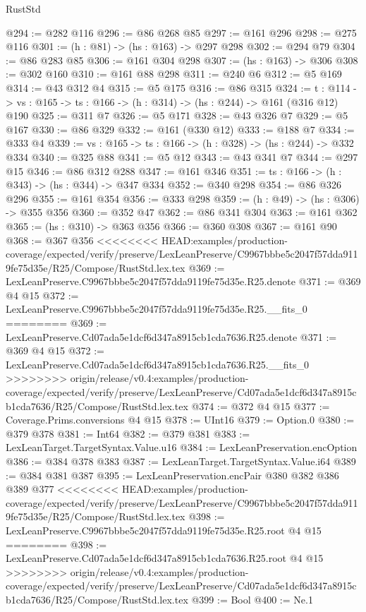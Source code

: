 \begin{lexlean}{RustStd}
\begin{coremodule}
{\begin{coremodule}
@294 := @282 @116
@296 := @86 @268 @85
@297 := @161 @296
@298 := @275 @116
@301 := (h : @81) -> (hs : @163) -> @297 @298
@302 := @294 @79
@304 := @86 @283 @85
@306 := @161 @304 @298
@307 := (hs : @163) -> @306
@308 := @302 @160
@310 := @161 @88 @298
@311 := @240 @6
@312 := @5 @169
@314 := @43 @312 @4
@315 := @5 @175
@316 := @86 @315
@324 := {t : @114} ->
  {vs : @165} -> {ts : @166} -> (h : @314) -> (hs : @244) -> @161 (@316 @12) @190
@325 := @311 @7
@326 := @5 @171
@328 := @43 @326 @7
@329 := @5 @167
@330 := @86 @329
@332 := @161 (@330 @12)
@333 := @188 @7
@334 := @333 @4
@339 := {vs : @165} -> {ts : @166} -> (h : @328) -> (hs : @244) -> @332 @334
@340 := @325 @88
@341 := @5 @12
@343 := @43 @341 @7
@344 := @297 @15
@346 := @86 @312 @288
@347 := @161 @346
@351 := {ts : @166} -> (h : @343) -> (hs : @344) -> @347 @334
@352 := @340 @298
@354 := @86 @326 @296
@355 := @161 @354
@356 := @333 @298
@359 := (h : @49) -> (hs : @306) -> @355 @356
@360 := @352 @47
@362 := @86 @341 @304
@363 := @161 @362
@365 := (hs : @310) -> @363 @356
@366 := @360 @308
@367 := @161 @90
@368 := @367 @356
<<<<<<<< HEAD:examples/production-coverage/expected/verify/preserve/LexLeanPreserve/C9967bbbe5c2047f57dda9119fe75d35e/R25/Compose/RustStd.lex.tex
@369 := LexLeanPreserve.C9967bbbe5c2047f57dda9119fe75d35e.R25.denote
@371 := @369 @4 @15
@372 := LexLeanPreserve.C9967bbbe5c2047f57dda9119fe75d35e.R25.__fits_0
========
@369 := LexLeanPreserve.Cd07ada5e1dcf6d347a8915cb1cda7636.R25.denote
@371 := @369 @4 @15
@372 := LexLeanPreserve.Cd07ada5e1dcf6d347a8915cb1cda7636.R25.__fits_0
>>>>>>>> origin/release/v0.4:examples/production-coverage/expected/verify/preserve/LexLeanPreserve/Cd07ada5e1dcf6d347a8915cb1cda7636/R25/Compose/RustStd.lex.tex
@374 := @372 @4 @15
@377 := Coverage.Prims.conversions @4 @15
@378 := UInt16
@379 := Option.{0}
@380 := @379 @378
@381 := Int64
@382 := @379 @381
@383 := LexLeanTarget.TargetSyntax.Value.u16
@384 := LexLeanPreservation.encOption
@386 := @384 @378 @383
@387 := LexLeanTarget.TargetSyntax.Value.i64
@389 := @384 @381 @387
@395 := LexLeanPreservation.encPair @380 @382 @386 @389 @377
<<<<<<<< HEAD:examples/production-coverage/expected/verify/preserve/LexLeanPreserve/C9967bbbe5c2047f57dda9119fe75d35e/R25/Compose/RustStd.lex.tex
@398 := LexLeanPreserve.C9967bbbe5c2047f57dda9119fe75d35e.R25.root @4 @15
========
@398 := LexLeanPreserve.Cd07ada5e1dcf6d347a8915cb1cda7636.R25.root @4 @15
>>>>>>>> origin/release/v0.4:examples/production-coverage/expected/verify/preserve/LexLeanPreserve/Cd07ada5e1dcf6d347a8915cb1cda7636/R25/Compose/RustStd.lex.tex
@399 := Bool
@400 := Ne.{1}

\end{coremodule}}
\end{coremodule}
\end{lexlean}
